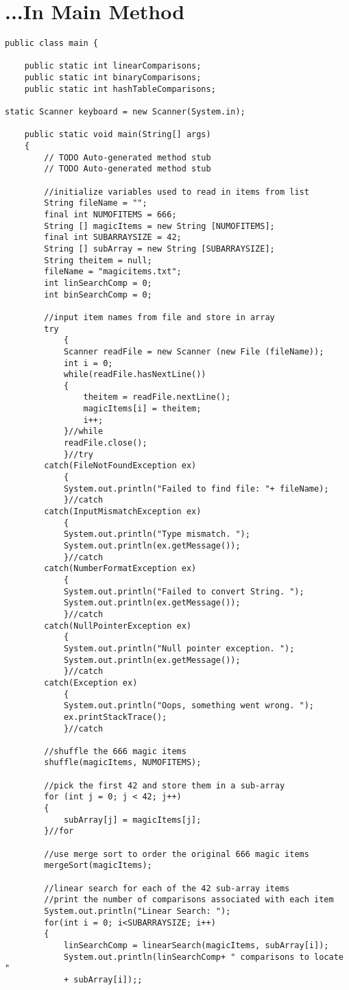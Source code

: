 \documentclass{article}
\begin{document}
\small
\section{...In Main Method}
\begin{lstlisting}[frame =single,
backgroundcolor = \color{grey!12}]
public class main {

	public static int linearComparisons;
	public static int binaryComparisons;
	public static int hashTableComparisons;
	
static Scanner keyboard = new Scanner(System.in);

	public static void main(String[] args) 
	{
		// TODO Auto-generated method stub
		// TODO Auto-generated method stub

		//initialize variables used to read in items from list
		String fileName = ""; 
		final int NUMOFITEMS = 666;
		String [] magicItems = new String [NUMOFITEMS];
		final int SUBARRAYSIZE = 42;
		String [] subArray = new String [SUBARRAYSIZE];
		String theitem = null;
		fileName = "magicitems.txt";
		int linSearchComp = 0;
		int binSearchComp = 0;
		
		//input item names from file and store in array
		try
			{
			Scanner readFile = new Scanner (new File (fileName));
			int i = 0; 
			while(readFile.hasNextLine())
			{
				theitem = readFile.nextLine();
				magicItems[i] = theitem;
				i++;
			}//while
			readFile.close();
			}//try
		catch(FileNotFoundException ex)
			{
			System.out.println("Failed to find file: "+ fileName);
			}//catch
		catch(InputMismatchException ex)
			{
			System.out.println("Type mismatch. ");
			System.out.println(ex.getMessage());
			}//catch
		catch(NumberFormatException ex)
			{
			System.out.println("Failed to convert String. ");
			System.out.println(ex.getMessage());
			}//catch
		catch(NullPointerException ex)
			{
			System.out.println("Null pointer exception. ");
			System.out.println(ex.getMessage());
			}//catch
		catch(Exception ex)
			{
			System.out.println("Oops, something went wrong. ");
			ex.printStackTrace();
			}//catch

		//shuffle the 666 magic items
		shuffle(magicItems, NUMOFITEMS);
		
		//pick the first 42 and store them in a sub-array
		for (int j = 0; j < 42; j++)
		{
			subArray[j] = magicItems[j];
		}//for
		
		//use merge sort to order the original 666 magic items
		mergeSort(magicItems);
		
		//linear search for each of the 42 sub-array items
		//print the number of comparisons associated with each item
		System.out.println("Linear Search: ");
		for(int i = 0; i<SUBARRAYSIZE; i++)
		{
			linSearchComp = linearSearch(magicItems, subArray[i]);
			System.out.println(linSearchComp+ " comparisons to locate "
			+ subArray[i]);;
			

\end{lstlisting}
\end{document}
